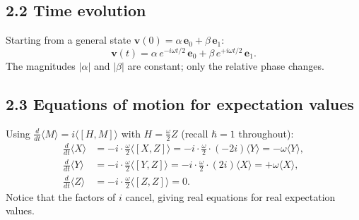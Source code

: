 \documentclass[12pt,a4paper]{article}
\begin{document}
\subsection{2.2 Time evolution}
Starting from a general state $\mathbf{v}(0)=\alpha\,\mathbf{e}_0+\beta\,\mathbf{e}_1$:
\[
    \mathbf{v}(t) = \alpha\,e^{-i\omega t/2}\,\mathbf{e}_0 + \beta\,e^{+i\omega t/2}\,\mathbf{e}_1.
\]
The magnitudes $|\alpha|$ and $|\beta|$ are constant; only the relative phase changes.

\subsection{2.3 Equations of motion for expectation values}
Using $\frac{d}{dt}\langle M \rangle = i\langle [H,M] \rangle$ with $H=\frac{\omega}{2}Z$ (recall $\hbar=1$ throughout):
\begin{align}
    \frac{d}{dt}\langle X \rangle &= -i\cdot\frac{\omega}{2}\langle[X,Z]\rangle
    = -i\cdot\frac{\omega}{2}\cdot(-2i)\langle Y \rangle = -\omega\langle Y \rangle, \\
    \frac{d}{dt}\langle Y \rangle &= -i\cdot\frac{\omega}{2}\langle[Y,Z]\rangle
    = -i\cdot\frac{\omega}{2}\cdot(2i)\langle X \rangle = +\omega\langle X \rangle, \\
    \frac{d}{dt}\langle Z \rangle &= -i\cdot\frac{\omega}{2}\langle[Z,Z]\rangle = 0.
\end{align}
Notice that the factors of $i$ cancel, giving real equations for real expectation values.
\end{document}
